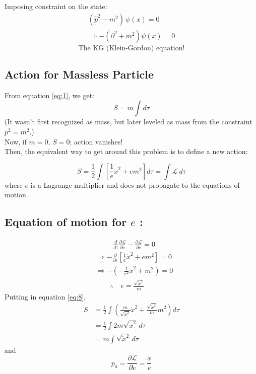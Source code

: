 \documentclass[14pt]{article} %
\begin{document}
Imposing constraint on the state:
\begin{align*}
    (\hat{p}^2 - m^2) \, \psi(x) = 0 \\
    \Rightarrow - (\partial^2 + m^2) \psi(x) = 0
\end{align*}
$$ \text{The KG (Klein-Gordon) equation!} $$
\subsection{Action for Massless Particle}
From equation \eqref{eq:1}, we get:
\[
S = m \int d\tau
\]
(It wasn't first recognized as mass, but later leveled as mass from the constraint $p^2 = m^2$.)\\

Now, if $m=0$, $S=0$; action vanishes!\\

Then, the equivalent way to get around this problem is to define a new action:

\[
S = \frac{1}{2} \int \left[ \frac{1}{e} \dot{x}^2 + e m^2 \right] d\tau =\int \mathcal{L}~ d \tau \tag{8} \label{eq:8}
\]
where $e$ is a Lagrange multiplier and does not propagate to the equations of motion.
\subsection*{Equation of motion for $e$ :}
\begin{align*}
    & \quad\quad~~\frac{d}{d\tau} \frac{\partial \mathcal{L}}{\partial \dot{e}} - \frac{\partial \mathcal{L}}{\partial e} = 0 \\
    & \Rightarrow -\frac{\partial}{\partial e} \left[ \frac{1}{e} \dot{x}^2 + e m^2 \right] = 0 \\
    & \Rightarrow -\left( -\frac{1}{e^2} \dot{x}^2 + m^2 \right) = 0 \\
    & \quad\quad\therefore \quad e = \frac{\sqrt{\dot{x}^2}}{m}
\quad \tag{9} \label{eq:9}
\end{align*}
Putting in equation \eqref{eq:8},
\begin{align*}
    S &= \frac{1}{2} \int \left( \frac{m}{\sqrt{\dot{x}^2}} \dot{x}^2 + \frac{\sqrt{\dot{x}^2}}{m} m^2 \right) d\tau \\
    &= \frac{1}{2} \int 2m \sqrt{\dot{x}^2} \, d\tau \\
    &= m \int \sqrt{\dot{x}^2} \, d\tau \tag{10} \label{eq:10}
\end{align*}
and
\[
p_a = \frac{\partial \mathcal{L}}{\partial \dot{e}} = \frac{\dot{x}}{e} \tag{11}
\label{eq:11}
\]
\end{document}
